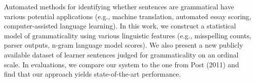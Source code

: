 Automated methods for identifying whether sentences are grammatical have various potential applications (e.g., machine translation, automated essay scoring, computer-assisted language learning).                                 In this work, we construct a statistical model of grammaticality using various linguistic features (e.g., misspelling counts, parser outputs, n-gram language model scores). We also present a new publicly available dataset of learner sentences judged for grammaticality on an ordinal scale. In evaluations, we compare our system to the one from Post (2011) and find that our approach yields state-of-the-art performance.
